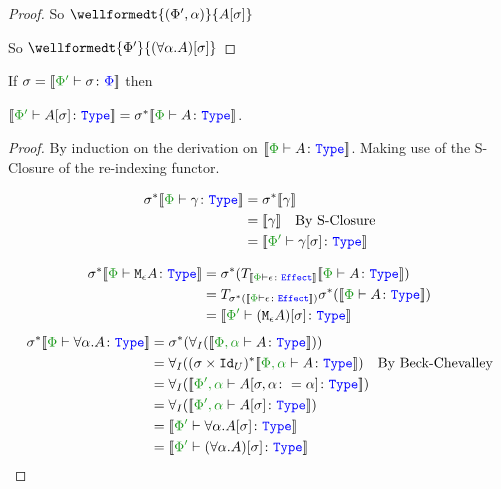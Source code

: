 \documentclass{report}
\begin{document}
\begin{framed}
\begin{proof}
        So $\wellformedt{(\P',\a)}{A\ssi}$
        
        So $\wellformedt{\P'}{(\all{\a}{A})\ssi}$
        
    \end{proof}
    
\end{framed}\begin{theorem}
    If $\si = \deno{\typerelation{\P'}{\si}{\P}}$ then 
    
    $\deno{\typerelation{\P'}{A\ssi}{\type}} = \si\star\deno{\typerelation{\P}{A}{\type}}$.
\end{theorem}

\begin{framed}
    \begin{proof}
        By induction on the derivation on $\deno{\typerelation{\P}{A}{\type}}$. Making use of the S-Closure of the re-indexing functor.
        
        \case{\tground}
        \begin{align*}
            \si\star\deno{\typerelation{\P}{\g}{\type}} &= \si\star\deno{\g}\\
            & =  \deno{\g}\qt{By S-Closure}\\
            & = \deno{\typerelation{\P'}{\g\ssi}{\type}}
        \end{align*}
        
        \case{\teffect}
        \begin{align*}
            \si\star\deno{\typerelation{\P}{\mea}{\type}} & =  \si\star(\T{\deno{\typerelation{\P}{\e}{\effect}}}{\deno{\typerelation{\P}{A}{\type}}})\\
            &= \T{\si\star(\deno{\typerelation{\P}{\e}{\effect}})}{\si\star(\deno{\typerelation{\P}{A}{\type}})}\\
            & = \deno{\typerelation{\P'}{(\mea)\ssi}{\type}}
        \end{align*}
        \case{\tquant}
            \begin{align*}
                \si\star\deno{\typerelation{\P}{\all{\a}A}{\type}} & = \si\star(\allI(\deno{\typerelation{\P,\a}{A}{\type}}))\\
                & = \allI((\si\times\Id{U})\star\deno{\typerelation{\P,\a}{A}{\type}})\qt{By Beck-Chevalley}\\
                & = \allI(\deno{\typerelation{\P',\a}{A\sub{\si, \a\setto\a}}{\type}})\\
                & = \allI(\deno{\typerelation{\P',\a}{A\ssi}{\type}})\\
                & = \deno{\typerelation{\P'}{\all{\a}{A\ssi}}{\type}}\\
                & = \deno{\typerelation{\P'}{(\all{\a}{A})\ssi}{\type}}\\
            \end{align*}
        

\end{proof}
\end{framed}
\end{document}
